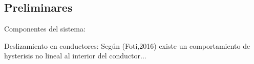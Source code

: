 \documentclass[
  aspectratio=169,
]{beamer}
\begin{document}
\begin{small}
\subsection[Preliminares]{Preliminares}
\begin{frame}{Componentes del sistema:}{}
	\vspace{-.5cm}	
	\setcounter{figure}{0}
	\begin{figure}[htbp]
		\centering
	\end{figure}
\end{frame}
\begin{frame}{Deslizamiento en conductores:}{}
	\setcounter{figure}{0}
  	Según {\color{blue}(Foti,2016)} existe un comportamiento de \alert{hysterisis no lineal} al interior del conductor...


\end{frame}
\end{small}
\end{document}
